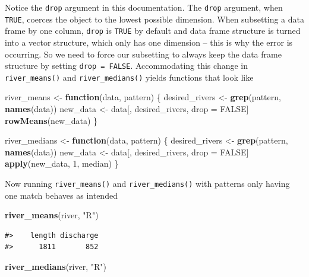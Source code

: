 \documentclass[
]{book}
\newenvironment{Shaded}{\begin{snugshade}}{\end{snugshade}}
\newcommand{\ControlFlowTok}[1]{\textcolor[rgb]{0.13,0.29,0.53}{\textbf{#1}}}
\newcommand{\DecValTok}[1]{\textcolor[rgb]{0.00,0.00,0.81}{#1}}
\newcommand{\KeywordTok}[1]{\textcolor[rgb]{0.13,0.29,0.53}{\textbf{#1}}}
\newcommand{\NormalTok}[1]{#1}
\newcommand{\OtherTok}[1]{\textcolor[rgb]{0.56,0.35,0.01}{#1}}
\newcommand{\StringTok}[1]{\textcolor[rgb]{0.31,0.60,0.02}{#1}}
\begin{document}
Notice the \texttt{drop} argument in this documentation. The \texttt{drop} argument, when \texttt{TRUE}, coerces the object to the lowest possible dimension. When subsetting a data frame by one column, \texttt{drop} is \texttt{TRUE} by default and data frame structure is turned into a vector structure, which only has one dimension -- this is why the error is occurring. So we need to force our subsetting to always keep the data frame structure by setting \texttt{drop\ =\ FALSE}. Accommodating this change in \texttt{river\_means()} and \texttt{river\_medians()} yields functions that look like

\begin{Shaded}
\begin{Highlighting}[]
\NormalTok{river_means <-}\StringTok{ }\ControlFlowTok{function}\NormalTok{(data, pattern) \{}
\NormalTok{  desired_rivers <-}\StringTok{ }\KeywordTok{grep}\NormalTok{(pattern, }\KeywordTok{names}\NormalTok{(data))}
\NormalTok{  new_data <-}\StringTok{ }\NormalTok{data[, desired_rivers, drop =}\StringTok{ }\OtherTok{FALSE}\NormalTok{]}
  \KeywordTok{rowMeans}\NormalTok{(new_data)}
\NormalTok{\}}

\NormalTok{river_medians <-}\StringTok{ }\ControlFlowTok{function}\NormalTok{(data, pattern) \{}
\NormalTok{  desired_rivers <-}\StringTok{ }\KeywordTok{grep}\NormalTok{(pattern, }\KeywordTok{names}\NormalTok{(data))}
\NormalTok{  new_data <-}\StringTok{ }\NormalTok{data[, desired_rivers, drop =}\StringTok{ }\OtherTok{FALSE}\NormalTok{]}
  \KeywordTok{apply}\NormalTok{(new_data, }\DecValTok{1}\NormalTok{, median)}
\NormalTok{\}}
\end{Highlighting}
\end{Shaded}

Now running \texttt{river\_means()} and \texttt{river\_medians()} with patterns only having one match behaves as intended

\begin{Shaded}
\begin{Highlighting}[]
\KeywordTok{river_means}\NormalTok{(river, }\StringTok{"R"}\NormalTok{)}
\end{Highlighting}
\end{Shaded}

\begin{verbatim}
#>    length discharge 
#>      1811       852
\end{verbatim}

\begin{Shaded}
\begin{Highlighting}[]
\KeywordTok{river_medians}\NormalTok{(river, }\StringTok{"R"}\NormalTok{)}
\end{Highlighting}
\end{Shaded}
\end{document}
